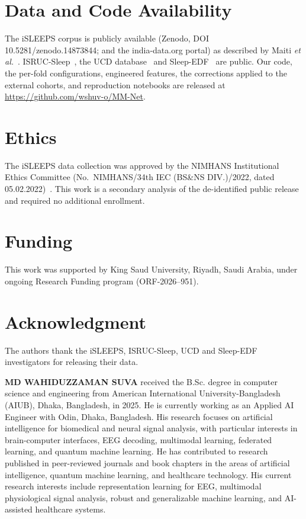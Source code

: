 \documentclass[a4paper,fleqn]{cas-sc}
\begin{document}
\section*{Data and Code Availability}
The iSLEEPS corpus is publicly available (Zenodo, DOI 10.5281/zenodo.14873844; and the
india-data.org portal) as described by Maiti \textit{et al.}~\cite{maiti2026isleeps}.
ISRUC-Sleep~\cite{khalighi2016isruc}, the UCD database~\cite{ucddb2007} and
Sleep-EDF~\cite{kemp2000sleepedf} are public. Our code, the per-fold configurations,
engineered features, the corrections applied to the external cohorts, and reproduction
notebooks are released at
\url{https://github.com/wshuv-o/MM-Net}.

\section*{Ethics}
The iSLEEPS data collection was approved by the NIMHANS Institutional Ethics Committee
(No.\ NIMHANS/34th IEC (BS\&NS DIV.)/2022, dated 05.02.2022)~\cite{maiti2026isleeps}. This work
is a secondary analysis of the de-identified public release and required no additional
enrollment.

\section*{Funding}
This work was supported by King Saud University, Riyadh, Saudi Arabia, under ongoing Research Funding program (ORF-2026–951).

\section*{Acknowledgment}
The authors thank the iSLEEPS, ISRUC-Sleep, UCD and Sleep-EDF investigators for releasing
their data.




%

\textbf{MD WAHIDUZZAMAN SUVA} received the B.Sc. degree in computer science and engineering from American International University-Bangladesh (AIUB), Dhaka, Bangladesh, in 2025. He is currently working as an Applied AI Engineer with Odin, Dhaka, Bangladesh. His research focuses on artificial intelligence for biomedical and neural signal analysis, with particular interests in brain-computer interfaces, EEG decoding, multimodal learning, federated learning, and quantum machine learning. He has contributed to research published in peer-reviewed journals and book chapters in the areas of artificial intelligence, quantum machine learning, and healthcare technology. His current research interests include representation learning for EEG, multimodal physiological signal analysis, robust and generalizable machine learning, and AI-assisted healthcare systems.
\endbio
\end{document}
